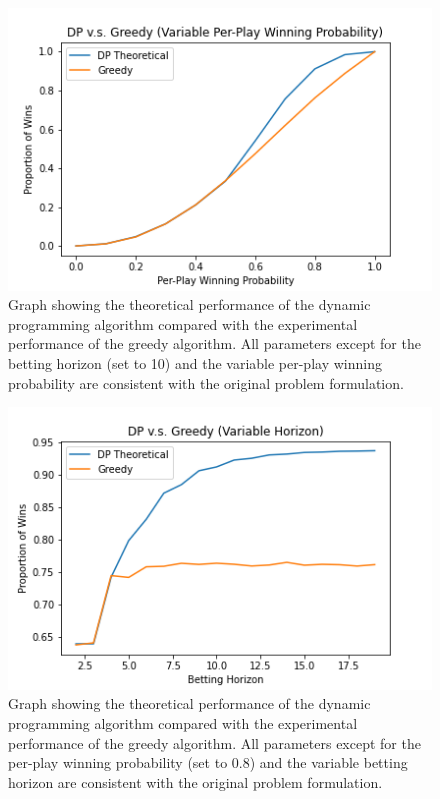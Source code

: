 \documentclass[conference]{IEEEtran}
\begin{document}
\begin{figure}[htbp]
\includegraphics[width=\columnwidth]{dp-vs-greedy-variable-per-play-winning-prob-and-betting-horizon-10.png}
\caption{Graph showing the theoretical performance of the dynamic programming algorithm compared with the experimental performance of the greedy algorithm. All parameters except for the betting horizon (set to 10) and the variable per-play winning probability are consistent with the original problem formulation.}
\label{dp-vs-greedy-variable-per-play-winning-prob-and-betting-horizon-10}
\end{figure}

\begin{figure}[htbp]
\includegraphics[width=\columnwidth]{dp-vs-greedy-variable-horizon-and-per-play-winning-prob-0_8.png}
\caption{Graph showing the theoretical performance of the dynamic programming algorithm compared with the experimental performance of the greedy algorithm. All parameters except for the per-play winning probability (set to $0.8$) and  the variable betting horizon are consistent with the original problem formulation.}
\label{dp-vs-greedy-variable-horizon-and-per-play-winning-prob-0_8}
\end{figure}
\end{document}
